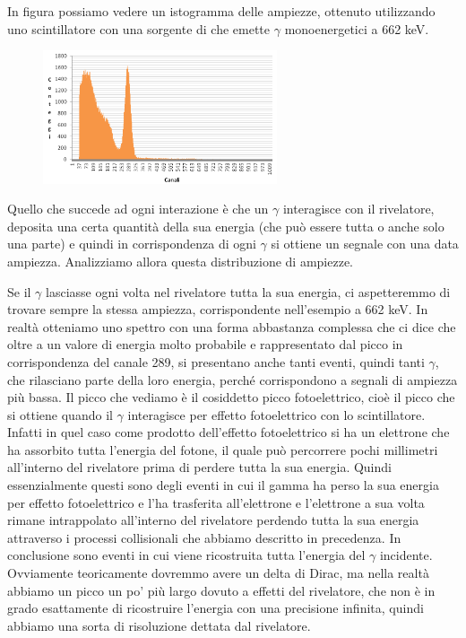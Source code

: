 \begin{esempio}\label{es:distr_ampiezze_cesio}
   In figura possiamo vedere un istogramma delle ampiezze, ottenuto utilizzando uno scintillatore con una sorgente di  che emette $\gamma$ monoenergetici a 662 keV.

\begin{figure}[H]
   \centering
   \includegraphics[width=0.615\textwidth]{immagini/distribuzione_ampiezze_impulsi_es_1.png}
\end{figure}

Quello che succede ad ogni interazione è che un $\gamma$ interagisce con il rivelatore, deposita una certa quantità della sua energia (che può essere tutta o anche solo una parte) e quindi in corrispondenza di ogni $\gamma$ si ottiene un segnale con una data ampiezza. Analizziamo allora questa distribuzione di ampiezze.

Se il $\gamma$ lasciasse ogni volta nel rivelatore tutta la sua energia, ci aspetteremmo di trovare sempre la stessa ampiezza, corrispondente nell'esempio a 662 keV. In realtà otteniamo uno spettro con una forma abbastanza complessa che ci dice che oltre a un valore di energia molto probabile e rappresentato dal picco in corrispondenza del canale 289, si presentano anche tanti eventi, quindi tanti $\gamma$, che rilasciano parte della loro energia, perché corrispondono a segnali di ampiezza più bassa. Il picco che vediamo è il cosiddetto picco fotoelettrico, cioè il picco che si ottiene quando il $\gamma$ interagisce per effetto fotoelettrico con lo scintillatore. Infatti in quel caso come prodotto dell'effetto fotoelettrico si ha un elettrone che ha assorbito tutta l'energia del fotone, il quale può percorrere pochi millimetri all'interno del rivelatore prima di perdere tutta la sua energia. Quindi essenzialmente questi sono degli eventi in cui il gamma ha perso la sua energia per effetto fotoelettrico e l'ha trasferita all'elettrone e l'elettrone a sua volta rimane intrappolato all'interno del rivelatore perdendo tutta la sua energia attraverso i processi collisionali che abbiamo descritto in precedenza. In conclusione sono eventi in cui viene ricostruita tutta l'energia del $\gamma$ incidente. Ovviamente teoricamente dovremmo avere un delta di Dirac\footnotemark, ma nella realtà abbiamo un picco un po' più largo dovuto a effetti del rivelatore, che non è in grado esattamente di ricostruire l'energia con una precisione infinita, quindi abbiamo una sorta di risoluzione dettata dal rivelatore.


\end{esempio}
